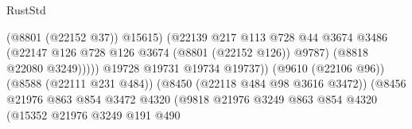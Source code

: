 \begin{lexlean}{RustStd}
\begin{coremodule}
                                                            (@8801 (@22152 @37))
                                                            @15615)
                                                          (@22139
                                                            @217
                                                            @113
                                                            @728
                                                            @44
                                                            @3674
                                                            @3486
                                                            (@22147
                                                              @126
                                                              @728
                                                              @126
                                                              @3674
                                                              (@8801 (@22152 @126))
                                                              @9787)
                                                            (@8818 @22080 @3249)))))
                                                    @19728
                                                    @19731
                                                    @19734
                                                    @19737))
                                                (@9610 (@22106 @96))
                                                (@8588 (@22111 @231 @484))
                                                (@8450 (@22118 @484 @98 @3616 @3472))
                                                (@8456
                                                  @21976
                                                  @863
                                                  @854
                                                  @3472
                                                  @4320
                                                  (@9818
                                                    @21976
                                                    @3249
                                                    @863
                                                    @854
                                                    @4320
                                                    (@15352
                                                      @21976
                                                      @3249
                                                      @191
                                                      @490

\end{coremodule}
\end{lexlean}
